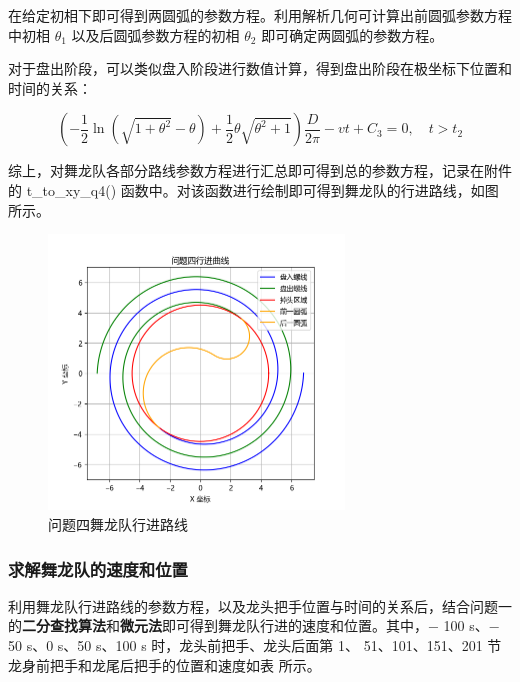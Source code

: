 \documentclass[a4paper]{article}
\begin{document}
		在给定初相下即可得到两圆弧的参数方程。利用解析几何可计算出前圆弧参数方程中初相 $\theta_1$ 以及后圆弧参数方程的初相 $\theta_2$ 即可确定两圆弧的参数方程。
		
		对于盘出阶段，可以类似盘入阶段进行数值计算，得到盘出阶段在极坐标下位置和时间的关系：
		
		\begin{equation}
			(- \frac{1}{2}\ln(\sqrt{1 + \theta^2} - \theta) + \frac{1}{2} \theta \sqrt{\theta^2 + 1}) \frac{D}{2 \pi} - vt + C_3 = 0, \quad t > t_2
		\end{equation}
		
		综上，对舞龙队各部分路线参数方程进行汇总即可得到总的参数方程，记录在附件%
		的 t\_to\_xy\_q4() 函数中。对该函数进行绘制即可得到舞龙队的行进路线，如图%
		所示。
		
		\begin{figure}[H]
			\centering
			\includegraphics[width=0.7\textwidth]{image/Figure_5412.png}
			\caption{问题四舞龙队行进路线}
			\label{Figure_5412}
		\end{figure}
	
	\subsubsection{求解舞龙队的速度和位置}
	
		利用舞龙队行进路线的参数方程，以及龙头把手位置与时间的关系后，结合问题一的\textbf{二分查找算法}和\textbf{微元法}即可得到舞龙队行进的速度和位置。其中，− 100 s、− 50 s、0 s、50 s、100 s 时，龙头前把手、龙头后面第 1、
		51、101、151、201 节龙身前把手和龙尾后把手的位置和速度如表%
		所示。
		
\end{document}
